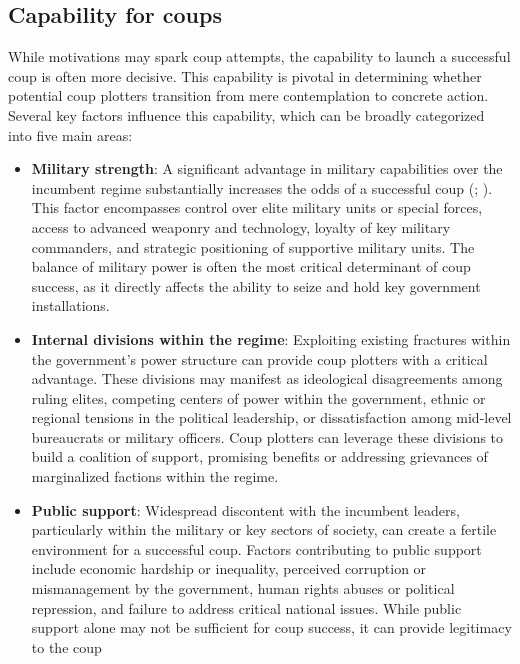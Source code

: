 \documentclass[
  12pt,
]{report}
\begin{document}
\subsection{Capability for coups}\label{capability-for-coups}

While motivations may spark coup attempts, the capability to launch a
successful coup is often more decisive. This capability is pivotal in
determining whether potential coup plotters transition from mere
contemplation to concrete action. Several key factors influence this
capability, which can be broadly categorized into five main areas:

\begin{itemize}
\item
  \textbf{Military strength}: A significant advantage in military
  capabilities over the incumbent regime substantially increases the
  odds of a successful coup (; ). This factor
  encompasses control over elite military units or special forces,
  access to advanced weaponry and technology, loyalty of key military
  commanders, and strategic positioning of supportive military units.
  The balance of military power is often the most critical determinant
  of coup success, as it directly affects the ability to seize and hold
  key government installations.
\item
  \textbf{Internal divisions within the regime}: Exploiting existing
  fractures within the government's power structure can provide coup
  plotters with a critical advantage. These divisions may manifest as
  ideological disagreements among ruling elites, competing centers of
  power within the government, ethnic or regional tensions in the
  political leadership, or dissatisfaction among mid-level bureaucrats
  or military officers. Coup plotters can leverage these divisions to
  build a coalition of support, promising benefits or addressing
  grievances of marginalized factions within the regime.
\item
  \textbf{Public support}: Widespread discontent with the incumbent
  leaders, particularly within the military or key sectors of society,
  can create a fertile environment for a successful coup. Factors
  contributing to public support include economic hardship or
  inequality, perceived corruption or mismanagement by the government,
  human rights abuses or political repression, and failure to address
  critical national issues. While public support alone may not be
  sufficient for coup success, it can provide legitimacy to the coup

\end{itemize}
\end{document}
